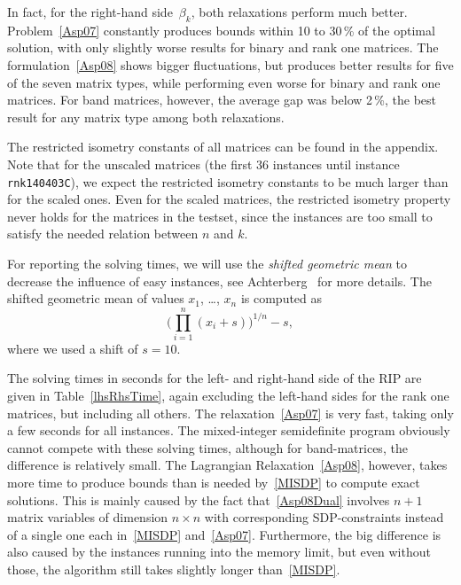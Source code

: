 \documentclass[journal]{IEEEtran}
\begin{document}


In fact, for the right-hand side~$\beta_k$,  both relaxations
perform much better. Problem~\eqref{Asp07} constantly produces bounds within 10 to 30\,\% of the optimal
solution, with only slightly worse results for binary and rank one matrices. The formulation~\eqref{Asp08}
shows bigger fluctuations, but produces better results for five of the seven matrix types, while performing even
worse for binary and rank one matrices. For band matrices, however, the average gap was below 2\,\%, the best 
result for any matrix type among both relaxations.

The restricted isometry constants of all matrices can be found in the
appendix. Note that for the unscaled matrices (the first 36 instances until
instance \texttt{rnk140403C}),
we expect the restricted isometry constants to be much larger than for the scaled ones. Even for the scaled
matrices, the restricted isometry property never holds for the matrices in the testset, since the instances
are too small to satisfy the needed relation between $n$ and $k$.

For reporting the solving times, we will use the \emph{shifted
  geometric mean} to decrease the influence of easy instances, see
Achterberg~\cite{SCIP} for more details. The shifted geometric
mean of values $x_1$, \dots, $x_n$ is computed as
\begin{equation*}
  \Big( \prod_{i=1}^n (x_i + s)\Big)^{1/n} - s,
\end{equation*}
where we used a shift of $s=10$.

The solving times in seconds for the left- and right-hand side of the RIP are given in
Table~\ref{lhsRhsTime}, again excluding the left-hand sides for the rank one matrices,
but including all others. The relaxation~\eqref{Asp07}
is very fast, taking only a few seconds for all instances. The mixed-integer semidefinite program obviously
cannot compete with these solving times, although for band-matrices, the difference is relatively
small. The Lagrangian Relaxation~\eqref{Asp08}, however, takes more time to produce bounds than is needed
by~\eqref{MISDP} to compute exact solutions. This is mainly caused by the fact that~\eqref{Asp08Dual} involves
$n+1$ matrix variables of dimension $n\times n$ with corresponding SDP-constraints instead of a 
single one each in~\eqref{MISDP} and~\eqref{Asp07}.
Furthermore, the big difference is also caused by the instances running into the 
memory limit, but even without those, the algorithm still takes slightly longer than~\eqref{MISDP}.
\end{document}
